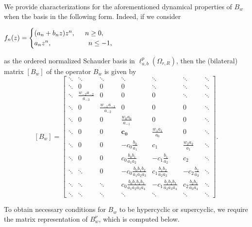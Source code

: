 \documentclass[12pt, reqno]{amsart}
\theoremstyle{definition}
\theoremstyle{remark}
\numberwithin{equation}{section}
\begin{document}
We provide characterizations for the aforementioned dynamical properties of $B_w$ when the basis in the following form. Indeed, if we consider 
 \begin{center}  
$f_n(z)=
\begin{cases}
   (a_n+b_{n}z)z^{n}, \hskip.5cm n\geq 0,\\ a_{n} z^{n},\hskip 1.9cm n\leq -1,
\end{cases}$
\end{center} 
as the ordered normalized Schauder basis in $\ell^{p}_{a,b}(\Omega_{r,R})$, then the (bilateral) matrix $[B_w]$ of the operator $B_{w}$ is given by
 \[   
  [B_w]=
  \begin{bmatrix}
  \ddots&  \ddots & \ddots & \ddots & \ddots&\ddots&\ddots\\
  \ddots& 0 & 0& 0&\ddots& \ddots&\ddots\\
  \ddots&\frac{w_{-2}a_{-2}}{a_{-3}} & 0& 0&0& \ddots&\ddots\\
\ddots& 0& \frac{w_{-1}a_{-1}}{a_{-2}} & 0&0 & 0 &\ddots\\
\ddots&0& 0 & \frac{w_{0}a_{0}}{a_{-1}} & 0&0&\ddots\\
  \ddots & 0&0&\boxed{\boldsymbol{c_{0}}} &\frac{w_{1}a_{1}}{a_{0}} &0&\ddots \\
	\ddots & 0&0&-c_{0}\frac{b_{0}}{a_{1}} & c_{1}&\frac{w_{2}a_{2}}{a_{1}}& \ddots\\
	\ddots & 0 & 0&c_{0}\frac{b_{0}b_{1}}{a_{1}a_{2}}&-c_{1}\frac{b_{1}}{a_{2}} &c_{2}&\ddots\\
	\ddots &  \ddots &0&-c_{0}\frac{b_{0}b_{1}b_{2}}{a_{1}a_{2}a_{3}}&c_{1}\frac{b_{1}b_{2}}{a_{2}a_{3}}&-c_{2}\frac{b_{2}}{a_{3}} &\ddots\\
 \ddots &   \ddots & \ddots&c_{0}\frac{b_{0}b_{1}b_{2}b_{3}}{a_{1}a_{2}a_{3}a_{4}}&-c_{1}\frac{b_{1}b_{2}b_{3}}{a_{2}a_{3}a_{4}}&c_{2}\frac{b_{2}b_{3}}{a_{3}a_{4}} &\ddots\\
	  \ddots & \ddots & \ddots&\ddots&\ddots &\ddots&\ddots 
	\end{bmatrix}.
 \]

To obtain necessary conditions for $B_w$ to be hypercyclic or supercyclic, we require the matrix representation of $B_{w}^{\nu}$, which is computed below.
\end{document}
